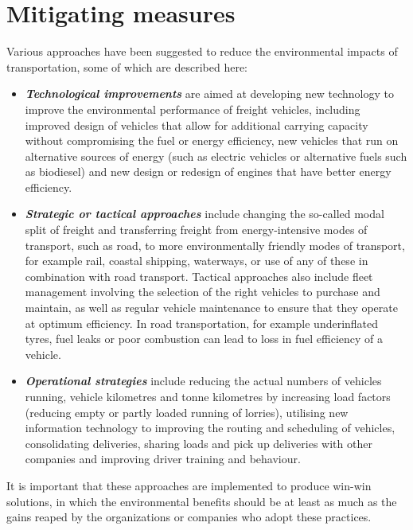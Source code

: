 \section{Mitigating measures}
Various approaches have been suggested to reduce the environmental impacts of transportation, some of which are described here:
\begin{itemize}
	\item \textbf{\textit{Technological improvements}} are aimed at developing new technology to improve the environmental performance of freight vehicles, including improved design of vehicles that allow for additional carrying capacity without compromising the fuel or energy efficiency, new vehicles that run on alternative sources of energy (such as electric vehicles or alternative fuels such as biodiesel) and new design or redesign of engines that have better energy efficiency.
	\item \textbf{\textit{Strategic or tactical approaches}} include changing the so-called modal split of freight and transferring freight from energy-intensive modes of transport, such as road, to more environmentally friendly modes of transport, for example rail, coastal shipping, waterways, or use of any of these in combination with road transport. Tactical approaches also include fleet management involving the selection of the right vehicles to purchase and maintain, as well as regular vehicle maintenance to ensure that they operate at optimum efficiency. In road transportation, for example underinflated tyres, fuel leaks or poor combustion can lead to loss in fuel efficiency of a vehicle.
	\item \textbf{\textit{Operational strategies}} include reducing the actual numbers of vehicles running, vehicle kilometres and tonne kilometres by increasing load factors (reducing empty or partly loaded running of lorries), utilising new information technology to improving the routing and scheduling of vehicles, consolidating deliveries, sharing loads and pick up deliveries with other companies and improving driver training and behaviour.
\end{itemize}
It is important that these approaches are implemented to produce win-win solutions, in which the environmental benefits should be at least as much as the gains reaped by the organizations or companies who adopt these practices.
